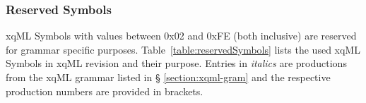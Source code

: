 
\subsubsection{Reserved Symbols}

xqML Symbols with values between 0x02 and 0xFE (both inclusive) are
reserved for grammar specific
purposes. Table~\ref{table:reservedSymbols} lists the used xqML
Symbols in xqML revision \xqMLver{} and their purpose. Entries in
\textit{italics} are productions from the xqML grammar listed in \S
\ref{section:xqml-gram} and the respective production numbers are
provided in brackets.

